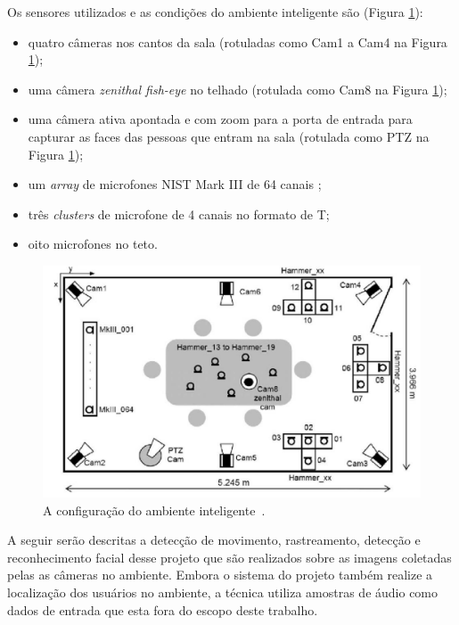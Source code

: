 Os sensores utilizados e as condições do ambiente inteligente são (Figura \ref{upc}):

	\begin{itemize}
		\item quatro câmeras nos cantos da sala (rotuladas como Cam1 a Cam4 na Figura \ref{upc});
		\item uma câmera \textit{zenithal fish-eye} no telhado (rotulada como Cam8 na Figura \ref{upc});
		\item uma câmera ativa apontada e com zoom para a porta de entrada para capturar as faces das pessoas que entram na sala (rotulada como PTZ na Figura \ref{upc});
		\item um \textit{array} de microfones NIST Mark III de 64 canais ;
		\item três \textit{clusters} de microfone de 4 canais no formato de T;
		\item oito microfones no teto.
	\end{itemize}

	\begin{figure}[hbt]
		\begin{center}
			\includegraphics[scale=0.4]{figuras/3.TrabalhosCorrelatos/upc.png}
		\end{center}
		\caption{A configuração do ambiente inteligente~\cite{salah}.}
		\label{upc}
	\end{figure}


A seguir serão descritas a detecção de movimento, rastreamento, detecção e reconhecimento facial desse projeto que são realizados sobre as imagens coletadas pelas as câmeras no ambiente. Embora o sistema do projeto também realize a localização dos usuários no ambiente, a técnica utiliza amostras de áudio como dados de entrada que esta fora do escopo deste trabalho.

